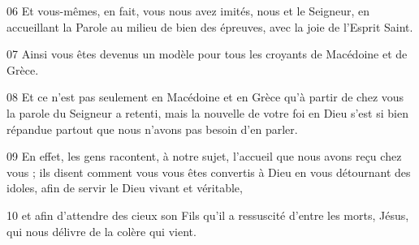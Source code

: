 
06 Et vous-mêmes, en fait, vous nous avez imités, nous et le Seigneur, en accueillant la Parole au milieu de bien des épreuves, avec la joie de l’Esprit Saint.

07 Ainsi vous êtes devenus un modèle pour tous les croyants de Macédoine et de Grèce.

08 Et ce n’est pas seulement en Macédoine et en Grèce qu’à partir de chez vous la parole du Seigneur a retenti, mais la nouvelle de votre foi en Dieu s’est si bien répandue partout que nous n’avons pas besoin d’en parler.

09 En effet, les gens racontent, à notre sujet, l’accueil que nous avons reçu chez vous ; ils disent comment vous vous êtes convertis à Dieu en vous détournant des idoles, afin de servir le Dieu vivant et véritable,

10 et afin d’attendre des cieux son Fils qu’il a ressuscité d’entre les morts, Jésus, qui nous délivre de la colère qui vient.

